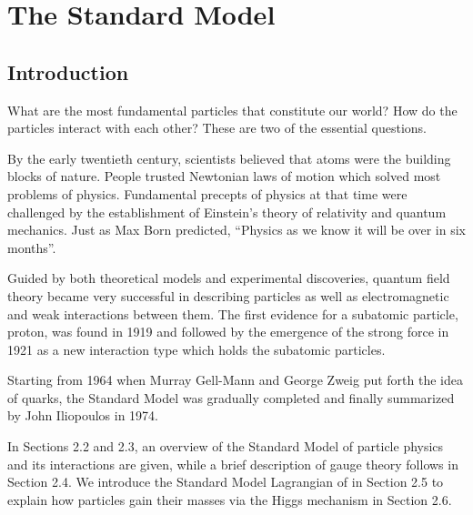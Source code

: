 \chapter{The Standard Model}

\label{ch:sm}

\section{Introduction}
\par   What are the most fundamental particles that constitute our world? How do the particles interact with each other?
These are two of the essential questions.

\par By the early twentieth century, scientists believed that atoms were the building blocks of nature. People trusted Newtonian laws of motion which solved most problems of physics.
Fundamental precepts of physics at that time were challenged by the establishment of Einstein's theory of relativity and quantum mechanics.
Just as Max Born predicted, ``Physics as we know it will be over in six months''.

\par Guided by both theoretical models and experimental discoveries, quantum field theory became very successful in describing particles as well as 
electromagnetic and weak interactions between them. The first evidence for a subatomic particle, proton, was found in 1919 and followed by the emergence of the strong force in 1921 as a new interaction type which holds the subatomic particles. 

\par Starting from 1964 when Murray Gell-Mann and George Zweig put forth the idea of quarks, 
the Standard Model was gradually completed and finally summarized by John Iliopoulos in 1974.

\par In Sections 2.2 and 2.3, an overview of the Standard Model of particle physics and its interactions are given, while
a brief description of gauge theory follows in Section 2.4. We introduce the Standard Model Lagrangian of in Section 2.5 to explain 
how particles gain their masses via the Higgs mechanism in Section 2.6.

